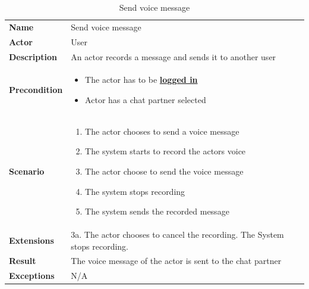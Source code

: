 \begin{table}[ht]
    \caption{Send voice message}
    \begin{tabular}{|L{5cm}|L{10cm}|}
        \toprule
        \textbf{Name}        & Send voice message                                         \\
        \textbf{Actor}       & User                                                       \\
        \textbf{Description} & An actor records a message and sends it to another user    \\
        \textbf{Precondition} &
        \vspace{-0.75cm}
        \begin{itemize}
            \setlength\itemsep{-0.5em}
            \item The actor has to be \textbf{\hyperref[tab:table8]{logged in}}
            \item Actor has a chat partner selected
        \end{itemize} \\[-0.5cm]
        \textbf{Scenario} &
        \vspace{-0.75cm}
        \begin{enumerate}
            \setlength\itemsep{-0.5em}
            \item The actor chooses to send a voice message
            \item The system starts to record the actors voice
            \item The actor choose to send the voice message
            \item The system stops recording
            \item The system sends the recorded message
        \end{enumerate} \\[-0.5cm]
        \textbf{Extensions} & 3a.
        The actor chooses to cancel the recording.
        The System stops recording. \\
        \textbf{Result}      & The voice message of the actor is sent to the chat partner \\
        \textbf{Exceptions}  & N/A                                                        \\
        \bottomrule
    \end{tabular}
    \label{tab:table18}
\end{table}

